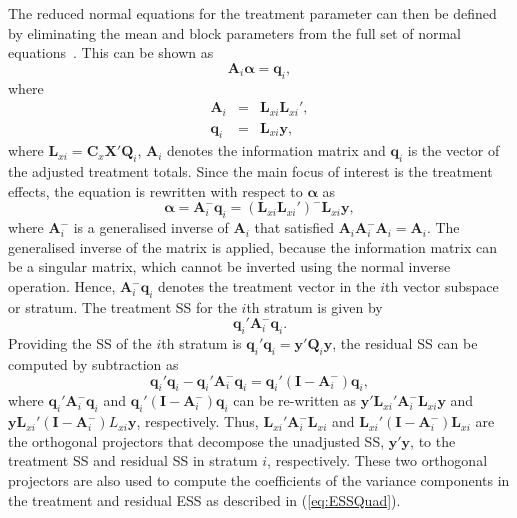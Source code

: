 \documentclass[article]{jss}
\newcommand{\I}{\mathbf{I}}
\newcommand{\X}{\mathbf{X}}
\newcommand{\Q}{\mathbf{Q}}
\newcommand{\A}{\mathbf{A}}
\newcommand{\C}{\mathbf{C}}
\newcommand{\mL}{\mathbf{L}}
\begin{document}
The reduced normal equations for the treatment parameter can then be defined by eliminating the mean and block parameters from the full set of normal equations~\citep{John1987}. This can be shown as
\[
\A_i\bm{\alpha} = \bm{q}_i,
\]
where
\begin{eqnarray*}
\A_i &=& \mL_{xi} \mL_{xi}' ,\\
\bm{q}_i &=& \mL_{xi} \bm{y},
\end{eqnarray*}
where $\mL_{xi} = \C_x \X' \Q_i$, $\A_i$ denotes the information matrix and $\bm{q}_i$ is the vector of the adjusted treatment totals. Since the main focus of interest is the treatment effects, the equation is rewritten with respect to $\bm{\alpha}$ as
\begin{equation}
\label{eq:trtVec}
\bm{\alpha} = \A_{i}^{-} \bm{q}_i = (\mL_{xi}\mL_{xi}')^{-}\mL_{xi} \bm{y},
\end{equation}
where $\A_{i}^{-}$ is a generalised inverse of $\A_{i}$ that satisfied $\A_{i} \A_{i}^{-} \A_{i} = \A_{i}$. The generalised inverse of the matrix is applied, because the information matrix can be a singular matrix, which cannot be inverted using the normal inverse operation. Hence, $\A_{i}^{-} \bm{q}_i$ denotes the treatment vector in the $i$th vector subspace or stratum. The treatment SS for the $i$th stratum is given by
\begin{equation}
\label{eq:trtSS}
\bm{q}_{i}' \A_{i}^{-} \bm{q}_{i}.
\end{equation}
Providing the SS of the $i$th stratum is $\bm{q}_{i}'\bm{q}_{i} = \bm{y}' \Q_i\bm{y}$, the residual SS can be computed by subtraction as 
\begin{equation}
\label{eq:resSS}
\bm{q}_{i}'\bm{q}_{i} - \bm{q}_{i}' \A_{i}^{-} \bm{q}_{i} = \bm{q}_{i}' ( \I -\A_{i}^{-}) \bm{q}_{i},
\end{equation}
where $\bm{q}_{i}' \A_{i}^{-} \bm{q}_{i}$ and $\bm{q}_{i}' ( \I -\A_{i}^{-}) \bm{q}_i$ can be re-written as $\bm{y}'\mL_{xi}' \A_{i}^{-}\mL_{xi}\bm{y}$ and $\bm{y}\mL_{xi}' ( \I - \A_{i}^{-}) L_{xi}\bm{y}$, respectively. Thus, $\mL_{xi}' \A_{i}^{-}\mL_{xi}$ and $\mL_{xi}' ( \I - \A_{i}^{-}) \mL_{xi}$  are the orthogonal projectors that decompose the unadjusted SS, $\bm{y}' \bm{y}$, to the treatment SS and residual SS in stratum $i$, respectively. These two orthogonal projectors are also used to compute the coefficients of the variance components in the treatment and residual ESS as described in (\ref{eq:ESSQuad}). 
\end{document}
